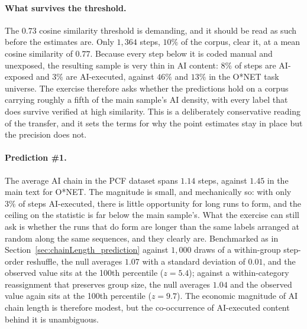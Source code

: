 \paragraph{What survives the threshold.}
The $0.73$ cosine similarity threshold is demanding, and it should be read as such before the estimates are.
Only $1{,}364$ steps, $10\%$ of the corpus, clear it, at a mean cosine similarity of $0.77$.
Because every step below it is coded manual and unexposed, the resulting sample is very thin in AI content:
$8\%$ of steps are AI-exposed and $3\%$ are AI-executed, against $46\%$ and $13\%$ in the O*NET task
universe.
The exercise therefore asks whether the predictions hold on a corpus carrying roughly a fifth of the main
sample's AI density, with every label that does survive verified at high similarity.
This is a deliberately conservative reading of the transfer, and it sets the terms for why the point estimates stay in place but the precision does not.

\paragraph{Prediction \#1.}
The average AI chain in the PCF dataset spans $1.14$ steps, against $1.45$ in the main text for O*NET.
The magnitude is small, and mechanically so: with only $3\%$ of steps AI-executed, there is little
opportunity for long runs to form, and the ceiling on the statistic is far below the main sample's.
What the exercise can still ask is whether the runs that do form are longer than the same labels arranged at
random along the same sequences, and they clearly are.
Benchmarked as in Section~\ref{sec:chainLength_prediction} against $1{,}000$ draws of a within-group
step-order reshuffle, the null averages $1.07$ with a standard deviation of $0.01$, and the observed value
sits at the 100th percentile ($z = 5.4$); against a within-category reassignment that preserves group size,
the null averages $1.04$ and the observed value again sits at the 100th percentile ($z = 9.7$).
The economic magnitude of AI chain length is therefore modest, but the co-occurrence of AI-executed content behind it is unambiguous.

